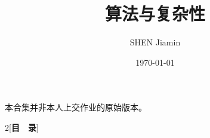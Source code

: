 \documentclass[answers]{exam}
\title{算法与复杂性}
\author{SHEN Jiamin}
\date{\today}
\begin{document}
\maketitle

{
    \color{red}
    本合集并非本人上交作业的原始版本。
}

\begin{multicols}{2}[\centering\textbf{\Large 目　录}]
    \renewcommand{\contentsname}{}
    \tableofcontents
\end{multicols}

\newpage

\newpage

\newpage

\newpage

\newpage

\newpage

\newpage

\newpage

\newpage

\newpage

\newpage

\newpage

\newpage

\newpage

\newpage

\newpage

\newpage

\newpage

\newpage

\newpage

\newpage

\newpage

\newpage

\end{document}

